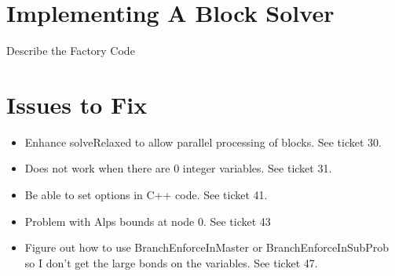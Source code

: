 \documentclass[11pt]{article}
\newcounter{Fig}
\renewcommand{\_}{{\char"5F}}
\renewcommand{\{}{{\char"7B}}
\renewcommand{\}}{{\char"7D}}
\renewcommand{\^}{{\char"0D}}
\renewcommand{\'}{{\char"0D}}
\begin{document}
\section{Implementing A Block Solver}

Describe the Factory Code

\section{Issues to Fix}

\begin{itemize}
  \item Enhance solveRelaxed to allow parallel processing of blocks. See ticket
  30.
  \item Does not work when there are 0 integer variables. See ticket 31.
  \item Be able to set options in C++ code. See ticket 41.
  \item Problem with Alps  bounds at node 0. See ticket 43
  \item Figure out how to use BranchEnforceInMaster or BranchEnforceInSubProb so
  I don't get the large bonds on the variables. See ticket 47.
\end{itemize}
\end{document}
